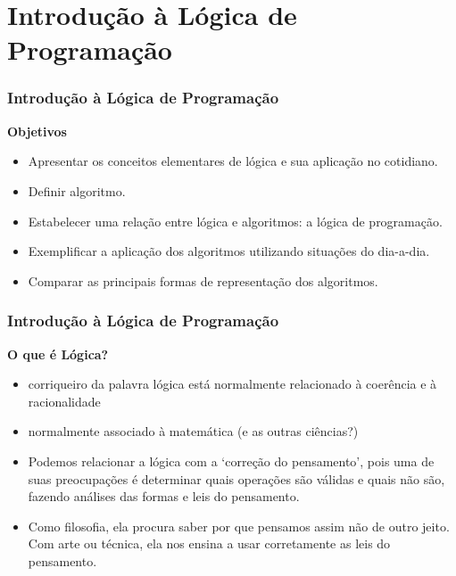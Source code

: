 \section{Introdução à Lógica de Programação}


\begin{frame}
	\frametitle{Introdução à Lógica de Programação}
	\textbf{Objetivos}
	\begin{itemize}
		\item Apresentar os conceitos elementares de lógica e sua aplicação no cotidiano. 
		
		\item Definir algoritmo. 
		
		\item Estabelecer uma relação entre lógica e algoritmos: a lógica de programação. 
		
		\item Exemplificar a aplicação dos 
		algoritmos utilizando situações do dia-a-dia. 
		
		\item Comparar as principais formas de representação dos algoritmos.
	\end{itemize}
\end{frame}



\begin{frame}
	\frametitle{Introdução à Lógica de Programação}
	\textbf{O que é Lógica?}
	\begin{itemize}
		\item  corriqueiro da palavra lógica está normalmente relacionado à coerência e à racionalidade
		
		\item normalmente associado à matemática (e as outras ciências?)
		
		\item Podemos relacionar a lógica com a ‘correção do pensamento’, pois uma de suas preocupações é determinar quais operações são válidas e quais não são, fazendo análises das formas e leis do pensamento. 
		
		\item  Como filosofia, ela procura saber por que pensamos assim não de outro jeito. Com arte ou técnica, ela nos ensina a usar corretamente as leis do pensamento.
	\end{itemize}
\end{frame}



